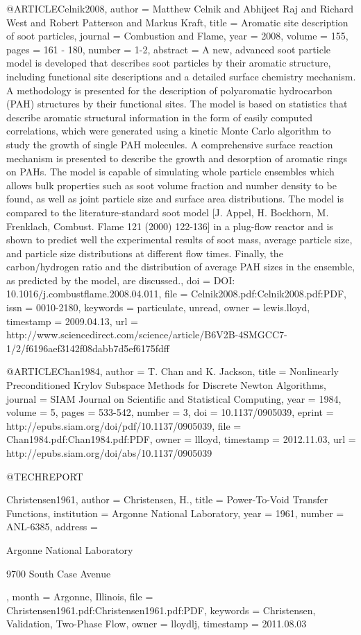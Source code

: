 @ARTICLE{Celnik2008,
  author = {Matthew Celnik and Abhijeet Raj and Richard West and Robert Patterson
	and Markus Kraft},
  title = {Aromatic site description of soot particles},
  journal = {Combustion and Flame},
  year = {2008},
  volume = {155},
  pages = {161 - 180},
  number = {1-2},
  abstract = {A new, advanced soot particle model is developed that describes soot
	particles by their aromatic structure, including functional site
	descriptions and a detailed surface chemistry mechanism. A methodology
	is presented for the description of polyaromatic hydrocarbon (PAH)
	structures by their functional sites. The model is based on statistics
	that describe aromatic structural information in the form of easily
	computed correlations, which were generated using a kinetic Monte
	Carlo algorithm to study the growth of single PAH molecules. A comprehensive
	surface reaction mechanism is presented to describe the growth and
	desorption of aromatic rings on PAHs. The model is capable of simulating
	whole particle ensembles which allows bulk properties such as soot
	volume fraction and number density to be found, as well as joint
	particle size and surface area distributions. The model is compared
	to the literature-standard soot model [J. Appel, H. Bockhorn, M.
	Frenklach, Combust. Flame 121 (2000) 122-136] in a plug-flow reactor
	and is shown to predict well the experimental results of soot mass,
	average particle size, and particle size distributions at different
	flow times. Finally, the carbon/hydrogen ratio and the distribution
	of average PAH sizes in the ensemble, as predicted by the model,
	are discussed.},
  doi = {DOI: 10.1016/j.combustflame.2008.04.011},
  file = {Celnik2008.pdf:Celnik2008.pdf:PDF},
  issn = {0010-2180},
  keywords = {particulate, unread},
  owner = {lewis.lloyd},
  timestamp = {2009.04.13},
  url = {http://www.sciencedirect.com/science/article/B6V2B-4SMGCC7-1/2/f6196aef3142f08dabb7d5ef6175fdff}
}

@ARTICLE{Chan1984,
  author = {T. Chan and K. Jackson},
  title = {Nonlinearly Preconditioned Krylov Subspace Methods for Discrete Newton
	Algorithms},
  journal = {SIAM Journal on Scientific and Statistical Computing},
  year = {1984},
  volume = {5},
  pages = {533-542},
  number = {3},
  doi = {10.1137/0905039},
  eprint = {http://epubs.siam.org/doi/pdf/10.1137/0905039},
  file = {Chan1984.pdf:Chan1984.pdf:PDF},
  owner = {llloyd},
  timestamp = {2012.11.03},
  url = {http://epubs.siam.org/doi/abs/10.1137/0905039}
}

@TECHREPORT{Christensen1961,
  author = {Christensen, H.},
  title = {Power-To-Void Transfer Functions},
  institution = {Argonne National Laboratory},
  year = {1961},
  number = {ANL-6385},
  address = {Argonne National Laboratory
	
	9700 South Case Avenue},
  month = {Argonne, Illinois},
  file = {Christensen1961.pdf:Christensen1961.pdf:PDF},
  keywords = {Christensen, Validation, Two-Phase Flow},
  owner = {lloydlj},
  timestamp = {2011.08.03}
}


